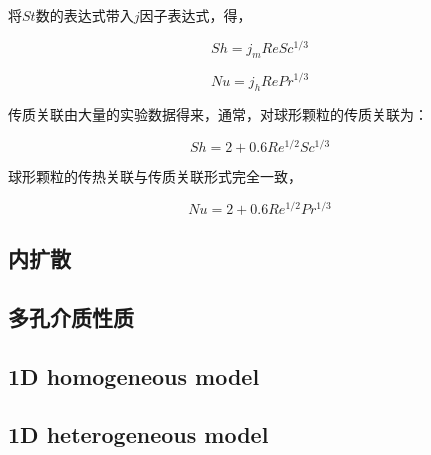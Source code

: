 将$ St $数的表达式带入$ j $因子表达式，得，

\[ Sh = j_m ReSc^{1/3} \]

\[ Nu = j_h RePr^{1/3} \]

传质关联由大量的实验数据得来，通常，对球形颗粒的传质关联为：

\[ Sh= 2+0.6Re^{1/2}Sc^{1/3} \]

球形颗粒的传热关联与传质关联形式完全一致，

\[ Nu=2+0.6Re^{1/2}Pr^{1/3} \]



\subsection{内扩散}

\subsection{多孔介质性质}

\subsection{1D homogeneous model}

\subsection{1D heterogeneous model}
